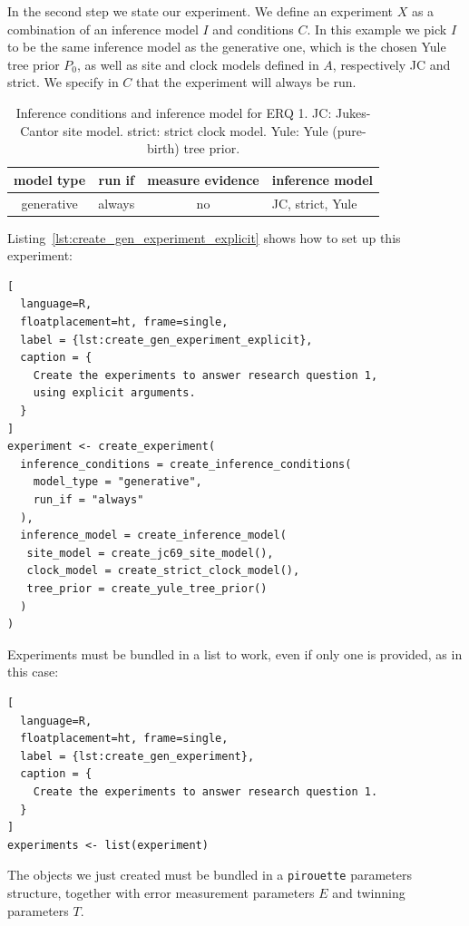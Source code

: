 \documentclass{article}
\begin{document}
In the second step we state our experiment.
We define an experiment $\mathit{X}$ as a combination of an inference model 
$\mathit{I}$
and conditions $\mathit{C}$.
In this example we pick $\mathit{I}$ to be the same inference model as the 
generative one,
which is the chosen Yule tree prior $\mathit{P_{0}}$, as well as site and clock 
models defined in $\mathit{A}$, respectively JC and strict.
We specify in $\mathit{C}$ that the experiment will always be run.

\begin{table}
  \begin{tabular}{ | c | c | c | l | }
    \hline
    \textbf{model type} & \textbf{run if} & \textbf{measure evidence} & 
\textbf{inference model} \\ 
    \hline
    generative & always & no & JC, strict, Yule \\
    \hline
  \end{tabular}
  \caption{
    Inference conditions and inference model for ERQ 1.
    JC: Jukes-Cantor site model.
    strict: strict clock model.
    Yule: Yule (pure-birth) tree prior.
  }
  \label{tab:RQ1}
\end{table}

Listing~\ref{lst:create_gen_experiment_explicit} shows how to
set up this experiment:

\begin{lstlisting}[
  language=R, 
  floatplacement=ht, frame=single,
  label = {lst:create_gen_experiment_explicit},
  caption = {
    Create the experiments to answer research question 1, 
    using explicit arguments.
  }
]
experiment <- create_experiment(
  inference_conditions = create_inference_conditions(
    model_type = "generative", 
    run_if = "always"
  ), 
  inference_model = create_inference_model(
   site_model = create_jc69_site_model(), 
   clock_model = create_strict_clock_model(), 
   tree_prior = create_yule_tree_prior()
  )
)
\end{lstlisting}

Experiments must be bundled in a list to work, even if only one is provided, as 
in this case:

\begin{lstlisting}[
  language=R, 
  floatplacement=ht, frame=single,
  label = {lst:create_gen_experiment},
  caption = {
    Create the experiments to answer research question 1.
  }
]
experiments <- list(experiment)
\end{lstlisting}

The objects we just created must be bundled
in a \verb;pirouette; parameters structure,
together with error measurement parameters $\mathit{E}$ and
twinning parameters $\mathit{T}$. 
\end{document}
